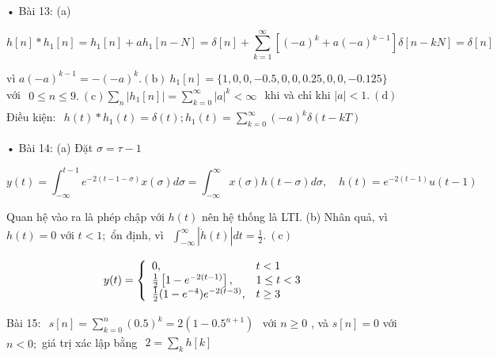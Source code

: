 \documentclass[
  10
]{article}
\begin{document}
• Bài 13: (a)

\[
h [ n ] * h _ {1} [ n ] = h _ {1} [ n ] + a h _ {1} [ n - N ] = \delta [ n ] + \sum_ {k = 1} ^ {\infty} \left[ (- a) ^ {k} + a (- a) ^ {k - 1} \right] \delta [ n - k N ] = \delta [ n ]
\]

vì
\(a ( - a ) ^ { k - 1 } = - ( - a ) ^ { k } . \mathrm { ( b ) } \ h _ { 1 } [ n ] = \{ 1 , 0 , 0 , - 0 . 5 , 0 , 0 , 0 . 2 5 , 0 , 0 , - 0 . 1 2 5 \}\)
với
\(\begin{array} { r } { 0 \leq n \leq 9 . \mathrm { ~ ( c ) } \sum _ { n } \vert h _ { 1 } [ n ] \vert = \sum _ { k = 0 } ^ { \infty } \vert a \vert ^ { k } < \infty } \end{array}\)
khi và chỉ khi \(| a | < 1 . ~ ( \mathrm { d } )\) Điều kiện:
\(\begin{array} { r } { h ( t ) * h _ { 1 } ( t ) = \delta ( t ) ; h _ { 1 } ( t ) = \sum _ { k = 0 } ^ { \infty } ( - a ) ^ { k } \delta ( t - k T ) } \end{array}\)

• Bài 14: (a) Đặt \(\sigma = \tau - 1\)

\[
y (t) = \int_ {- \infty} ^ {t - 1} e ^ {- 2 (t - 1 - \sigma)} x (\sigma) d \sigma = \int_ {- \infty} ^ {\infty} x (\sigma) h (t - \sigma) d \sigma , \quad h (t) = e ^ {- 2 (t - 1)} u (t - 1)
\]

Quan hệ vào ra là phép chập với \(h ( t )\) nên hệ thống là LTI. (b)
Nhân quả, vì \(h ( t ) = 0\) với \(t < 1 ;\) ổn định, vì
\(\begin{array} { r } { \int _ { - \infty } ^ { \infty } \left| \dot { h } ( t ) \right| d t = \frac { 1 } { 2 } . ~ \mathrm { ( c ) } } \end{array}\)

\[
y (t) = \left\{ \begin{array}{l l} 0, & t <   1 \\ \frac {1}{2} \left[ 1 - e ^ {- 2 (t - 1)} \right], & 1 \leq t <   3 \\ \frac {1}{2} (1 - e ^ {- 4})   e ^ {- 2 (t - 3)}, & t \geq 3 \end{array} \right.
\]

Bài 15:
\(\begin{array} { r } { s [ n ] = \sum _ { k = 0 } ^ { n } ( 0 . 5 ) ^ { k } = 2 \left( 1 - 0 . 5 ^ { n + 1 } \right) } \end{array}\)
với \(n \geq 0\) , và \(s [ n ] = 0\) với \(n < 0 ;\) giá trị xác lập
bằng \(\begin{array} { r } { 2 = \sum _ { k } h [ k ] } \end{array}\)
\end{document}
